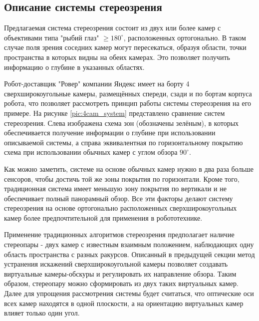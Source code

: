 \subsection{Описание системы стереозрения}

Предлагаемая система стереозрения состоит из двух или более камер с объективами типа "рыбий глаз" $\geqslant 180^\circ$,
расположенных ортогонально. В таком случае поля зрения соседних камер могут пересекаться, 
образуя  области, точки пространства в которых видны на обеих камерах. Это позволяет получить информацию о 
глубине в указанных областях. %

Робот-доставщик "Ровер" компании Яндекс имеет на борту 4 сверхширокоугольные камеры, размещённых спереди, сзади и по бортам 
корпуса робота, что позволяет рассмотреть принцип работы системы стереозрения на его примере. На рисунке \ref{pic:4cam_system} 
представлено сравнение систем стереозрения. Слева изображена схема зон (обозначены зелёным), в которых обеспечивается получение информации о глубине
 при использовании описываемой системы, а справа эквивалентная по горизонтальному  покрытию схема при использовании обычных камер 
 с углом обзора $90^\circ$. 
 

Как можно заметить, системе на основе обычных камер нужно в два раза больше сенсоров, чтобы достичь той же зоны покрытия 
по горизонтали.  Кроме того, традиционная система имеет меньшую зону покрытия по вертикали и не обеспечивает полный 
панорамный обзор. Все эти факторы делают систему стереозрения на основе ортогонально расположенных сверхширокоугольных камер 
более предпочтительной для применения в робототехнике.  %

Применение традиционных алгоритмов стереозрения предполагает наличие стереопары - двух камер с известным взаимным положением,   %
наблюдающих  одну область пространства с разных ракурсов. Описанный в предыдущей секции метод  устранения искажений 
сверхширокоугольной камеры позволяет создавать виртуальные камеры-обскуры и регулировать их направление обзора. Таким образом,
стереопару можно сформировать из двух таких виртуальных камер.  %
Далее для упрощения рассмотрения системы будет считаться, что оптические оси всех камер находятся в одной плоскости, 
а на ориентацию виртуальных камер влияет только один угол. %

